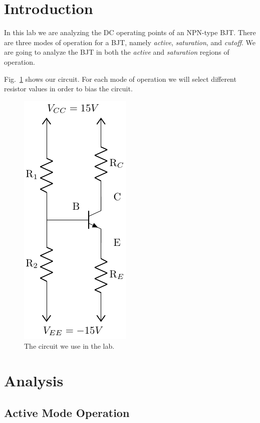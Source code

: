 \documentclass{../../ece-report}
\begin{document}
\maketitle

\section*{Introduction}

In this lab we are analyzing the DC operating points
of an NPN-type BJT. There are three modes of operation
for a BJT, namely \emph{active}, \emph{saturation},
and \emph{cutoff}. We are going to analyze the BJT in
both the \emph{active} and \emph{saturation} regions
of operation.

Fig.~\ref{fig:circuit} shows our circuit. For each mode
of operation we will select different resistor values
in order to bias the circuit.

\begin{figure}[h!]
  \centering
  \includegraphics{../circuit/circuit.pdf}
  \caption{The circuit we use in the lab.}
  \label{fig:circuit}
\end{figure}

\section*{Analysis}

\subsection*{Active Mode Operation}
\end{document}
